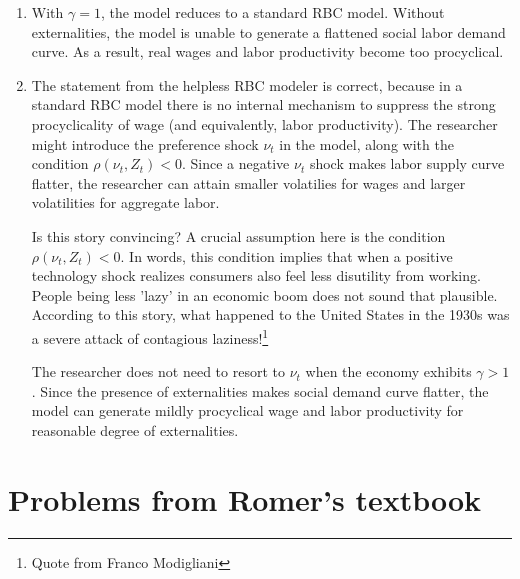 \documentclass[11pt]{amsart}
\begin{document}
\begin{enumerate}[label=(\alph*)]
	\item With $\gamma = 1$, the model reduces to a standard RBC model. Without externalities, the model is unable to generate a flattened social labor demand curve. As a result, real wages and labor productivity become too procyclical. 
	
	\item The statement from the helpless RBC modeler is correct, because in a standard RBC model there is no internal mechanism to suppress the strong procyclicality of wage (and equivalently, labor productivity). The researcher might introduce the preference shock $\nu_t$ in the model, along with the condition $\rho (\nu_t, Z_t) < 0$. Since a negative $\nu_t$ shock makes labor supply curve flatter, the researcher can attain smaller volatilies for wages and larger volatilities for aggregate labor. 
	
	Is this story convincing? A crucial assumption here is the condition $\rho (\nu_t, Z_t) < 0$. In words, this condition implies that when a positive technology shock realizes consumers also feel less disutility from working. People being less 'lazy' in an economic boom does not sound that plausible. According to this story, what happened to the United States in the 1930s was a severe attack of contagious laziness!\footnote{Quote from Franco Modigliani}
	
	The researcher does not need to resort to $\nu_t$ when the economy exhibits $\gamma > 1$. Since the presence of externalities makes social demand curve flatter, the model can generate mildly procyclical wage and labor productivity for reasonable degree of externalities. 
	
	
\end{enumerate}
\section{Problems from Romer's textbook}
\end{document}
